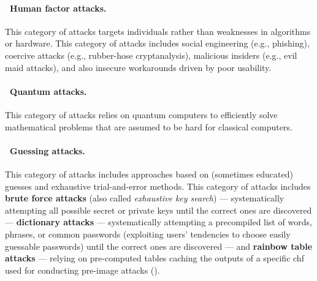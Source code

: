 
\paragraph*{\faUserSecret~Human factor attacks.} This category of attacks targets individuals rather than weaknesses in algorithms or hardware. This category of attacks includes social engineering (e.g., phishing), coercive attacks (e.g., rubber-hose cryptanalysis), malicious insiders (e.g., evil maid attacks), and also insecure workarounds driven by poor usability.

\paragraph*{\faAtom~Quantum attacks.} This category of attacks relies on quantum computers to efficiently solve mathematical problems that are assumed to be hard for classical computers.

\paragraph*{\faQuestion~Guessing attacks.} This category of attacks includes approaches based on (sometimes educated) guesses and exhaustive trial-and-error methods. This category of attacks includes \textbf{brute force attacks} (also called \textit{exhaustive key search}) --- systematically attempting all possible secret or private keys until the correct ones are discovered --- \textbf{dictionary attacks} --- systematically attempting a precompiled list of words, phrases, or common passwords (exploiting users' tendencies to choose easily guessable passwords) until the correct ones are discovered --- and \textbf{rainbow table attacks} --- relying on pre-computed tables caching the outputs of a specific \gls{chf} used for conducting pre-image attacks ().


